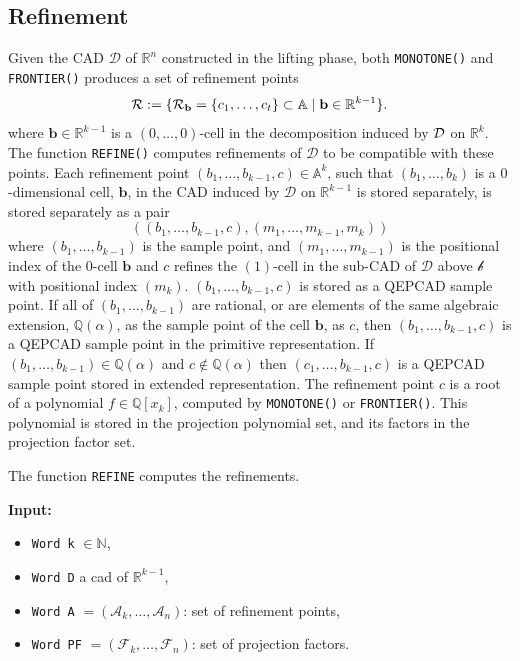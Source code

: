 \documentclass[
]{book}
\providecommand{\tightlist}{%
  \setlength{\itemsep}{0pt}\setlength{\parskip}{0pt}}
\theoremstyle{definition}
\theoremstyle{definition}
\theoremstyle{definition}
\theoremstyle{definition}
\theoremstyle{remark}
\begin{document}
\hypertarget{sec:implementation-refinement}{%
\subsection{Refinement}\label{sec:implementation-refinement}}

Given the CAD \(\mathcal{D}\) of \(\mathbb{R}^n\) constructed in the lifting phase, both \texttt{MONOTONE()} and \texttt{FRONTIER()} produces a set of refinement points
\[
{\cal R} := \{ {\cal R}_{\mathbf{b}} = \{ c_1,\ldots,c_t \} \subset \mathbb{A}\mid \mathbf{b} \in \mathbb{R}^{k-1} \}.
\]
where
\(\mathbf{b} \in \mathbb{R}^{k-1}\) is a \((0,\ldots,0)\)-cell in the decomposition induced by \({\cal D}\) on \(\mathbb{R}^k\).
The function \texttt{REFINE()} computes refinements of \(\mathcal{D}\) to be compatible with these points. Each refinement point \((b_1,\ldots,b_{k-1},c) \in \mathbb{A}^k\), such that \((b_1,\ldots,b_k)\) is a \(0\)-dimensional cell, \(\mathbf{b}\), in the CAD induced by \(\mathcal{D}\) on \(\mathbb{R}^{k-1}\) is stored separately, is stored separately as a pair
\[
((b_1,\ldots,b_{k-1},c), (m_1,\ldots,m_{k-1},m_k))
\]
where \((b_1,\ldots,b_{k-1})\) is the sample point, and \((m_1,\ldots,m_{k-1})\) is the positional index of the \(0\)-cell \(\mathbf{b}\) and \(c\) refines the \((1)\)-cell in the sub-CAD of \(\mathcal{D}\) above \(\mathcal{b}\) with positional index \((m_k)\).
\((b_1,\ldots,b_{k-1},c)\) is stored as a QEPCAD sample point.
If all of \((b_1,\ldots,b_{k-1})\) are rational, or are elements of the same algebraic extension, \(\mathbb{Q}(\alpha)\), as the sample point of the cell \(\mathbf{b}\), as \(c\), then \((b_1,\ldots,b_{k-1},c)\) is a QEPCAD sample point in the primitive representation. If \((b_1,\ldots,b_{k-1}) \in \mathbb{Q}(\alpha)\) and \(c \not \in \mathbb{Q}(\alpha)\) then \((c_1,\ldots,b_{k-1},c)\) is a QEPCAD sample point stored in extended representation.
The refinement point \(c\) is a root of a polynomial \(f \in \mathbb{Q}[x_k]\), computed by \texttt{MONOTONE()} or \texttt{FRONTIER()}. This polynomial is stored in the projection polynomial set, and its factors in the projection factor set.

The function \texttt{REFINE} computes the refinements.

\textbf{Input:}

\begin{itemize}
\tightlist
\item
  \texttt{Word\ k} \(\in \mathbb{N}\),
\item
  \texttt{Word\ D} a cad of \(\mathbb{R}^{k-1}\),
\item
  \texttt{Word\ A} \(= (\mathcal{A}_k, \ldots, \mathcal{A}_n)\): set of refinement points,
\item
  \texttt{Word\ PF} \(= (\mathcal{F}_k, \ldots, \mathcal{F}_n)\): set of projection factors.
\end{itemize}
\end{document}
